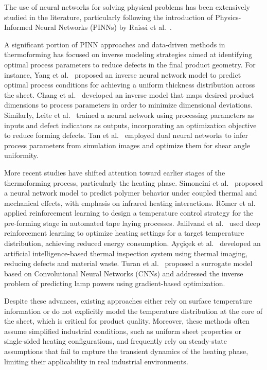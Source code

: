 \label{chap:pt2_state_of_the_art}

The use of neural networks for solving physical problems has been extensively studied in the literature, particularly following the introduction of Physics-Informed Neural Networks (PINNs) by Raissi et al.~\cite{raissi2019physics}. 

A significant portion of PINN approaches and data-driven methods in thermoforming has focused on inverse modeling strategies aimed at identifying optimal process parameters to reduce defects in the final product geometry. For instance, Yang et al.~\cite{yang2004modeling} proposed an inverse neural network model to predict optimal process conditions for achieving a uniform thickness distribution across the sheet. Chang et al.~\cite{chang2005derivation} developed an inverse model that maps desired product dimensions to process parameters in order to minimize dimensional deviations. Similarly, Leite et al.~\cite{leite2018vacuum} trained a neural network using processing parameters as inputs and defect indicators as outputs, incorporating an optimization objective to reduce forming defects. Tan et al.~\cite{tan2022prediction} employed dual neural networks to infer process parameters from simulation images and optimize them for shear angle uniformity.

More recent studies have shifted attention toward earlier stages of the thermoforming process, particularly the heating phase. Simoncini et al.~\cite{simoncini2017neural} proposed a neural network model to predict polymer behavior under coupled thermal and mechanical effects, with emphasis on infrared heating interactions. Römer et al.~\cite{romer2022temperature} applied reinforcement learning to design a temperature control strategy for the pre-forming stage in automated tape laying processes. Jalilvand et al.~\cite{jalilvand2024towards} used deep reinforcement learning to optimize heating settings for a target temperature distribution, achieving reduced energy consumption. Ayçiçek et al.~\cite{aycciccek2024ai} developed an artificial intelligence-based thermal inspection system using thermal imaging, reducing defects and material waste. Turan et al.~\cite{turan2025convolutional} proposed a surrogate model based on Convolutional Neural Networks (CNNs) and addressed the inverse problem of predicting lamp powers using gradient-based optimization.

Despite these advances, existing approaches either rely on surface temperature information or do not explicitly model the temperature distribution at the core of the sheet, which is critical for product quality. Moreover, these methods often assume simplified industrial conditions, such as uniform sheet properties or single-sided heating configurations, and frequently rely on steady-state assumptions that fail to capture the transient dynamics of the heating phase, limiting their applicability in real industrial environments.

